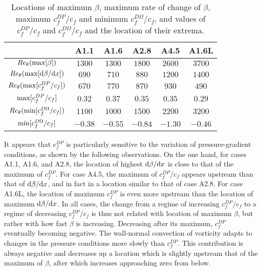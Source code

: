 \begin{table}
\caption{\label{tab:maxLocation} Locations of maximum $\beta$, maximum rate of change of $\beta$, maximum $c^{DP}_f/c_f$ and minimum $c^{D\Omega}_f/c_f$, and values of $c^{DP}_f/c_f$ and $c^{D\Omega}_f/c_f$ and the location of their extrema.}
\centering
  \fontsize{8.0pt}{12.25pt}\selectfont
  \addtolength{\tabcolsep}{-2pt}
\begin{tabular}{cccccc}
\hline \hline
 &A1.1&A1.6&A2.8&A4.5&A1.6L\\ \hline
$Re_\theta({\rm max}[\beta])$ & $1300$ & $1300$ & $1800$ & $2600$ & $3700$ \\
$Re_\theta({\rm max}[{\rm d} \beta/{\rm d} x])$ & $690$ & $710$ & $880$ & $1200$ & $1400$ \\ \hline
$Re_\theta({\rm max}[c^{DP}_f/c_f])$ & $670$ & $770$ & $870$ & $930$ & $490$ \\
${\rm max}[c^{DP}_f/c_f]$ & $0.32$ & $0.37$ & $0.35$ & $0.35$ & $0.29$ \\ \hline
$Re_\theta({\rm min}[c^{D\Omega}_f/c_f])$ & $1100$ & $1000$ & $1500$ & $2200$ & $3200$ \\
${\rm min}[c^{D\Omega}_f/c_f]$ & $-0.38$ & $-0.55$ & $-0.84$ & $-1.30$ & $-0.46$ \\
\hline \hline
\end{tabular}
%  
\end{table}


 It appears that $c^{DP}_f$ is particularly sensitive to the variation of pressure-gradient conditions, as shown by the following observations. On the one hand, for cases A1.1, A1.6, and A2.8, the location of highest ${\rm d} \beta / {\rm d} x$ is close to that of the maximum of $c^{DP}_f$. For case A4.5, the maximum of $c^{DP}_f/c_f$ appears upstream than that of ${\rm d} \beta / {\rm d} x$, and in fact in a location similar to that of case A2.8. For case A1.6L, the location of maximum $c^{DP}_f$ is even more upstream than the location of maximum ${\rm d} \beta / {\rm d} x$. In all cases, the change from a regime of increasing $c^{DP}_f/c_f$ to a regime of decreasing $c^{DP}_f/c_f$ is thus not related with location of maximum $\beta$, but rather with how fast $\beta$ is increasing. Decreasing after its maximum, $c^{DP}_f$ eventually becoming negative. The wall-normal convection of vorticity adapts to changes in the pressure conditions more slowly than $c^{DP}_f$. This contribution is always negative and decreases up a location which is slightly upstream that of the maximum of $\beta$, after which increases approaching zero from below. 
 
